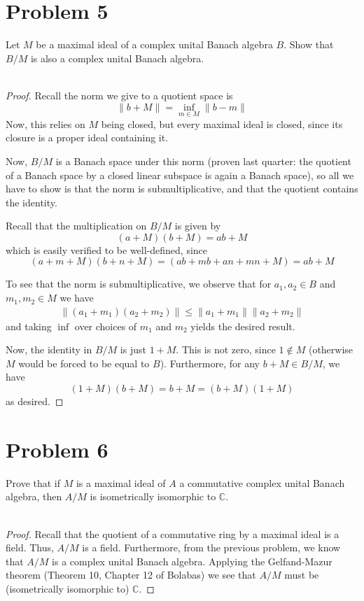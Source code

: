 \documentclass[fontsize=11pt]{scrartcl} %
\numberwithin{equation}{section} %
\numberwithin{figure}{section} %
\numberwithin{table}{section} %
\newcommand{\C}{\mathbb{C}}
\begin{document}
\section*{Problem 5}
Let $M$ be a maximal ideal of a complex unital Banach algebra $B$. Show that
$B/{M}$ is also a complex unital Banach algebra.
\\
\\
\begin{proof}
    Recall the norm we give to a quotient space is
    \[
        \|b + M\| = \inf_{m\in M}\|b-m\|
    \]
    Now, this relies on $M$ being closed, but every maximal ideal is closed,
    since its closure is a proper ideal containing it.

    Now, $B/{M}$ is a Banach space under this norm (proven last quarter: the
        quotient of a Banach space by a closed linear subspace is again a Banach
    space), so all we have to show is that the norm is submultiplicative, and
    that the quotient contains the identity. 

    Recall that the multiplication on $B/{M}$ is given by
    \[
        (a+M)(b+M) = ab+M
    \]
which is easily verified to be well-defined, since 
\[
    (a+m+M)(b+n+M) = (ab + mb + an+mn +M) = ab+M
\]

    To see that the norm is submultiplicative, we observe that for $a_1,a_2\in
    B$ and $m_1,m_2\in M$ we have
    \[
        \begin{aligned}
            \|(a_1+m_1)(a_2+m_2)\|\leq \|a_1+m_1\|\|a_2+m_2\|
        \end{aligned}
    \]
    and taking $\inf$ over choices of $m_1$ and $m_2$ yields the desired result.

    Now, the identity in $B/{M}$ is just $1+M$. This is not zero, since
    $1\not\in M$ (otherwise $M$ would be forced to be equal to $B$).
    Furthermore, for any $b+M\in B/{M}$, we have
    \[
        (1+M)(b+M) = b+M = (b+M)(1+M)
    \]
    as desired.

\end{proof}

\newpage

\section*{Problem 6}
Prove that if $M$ is a maximal ideal of $A$ a commutative complex unital Banach
algebra, then $A/M$ is isometrically isomorphic to $\C$.
\\
\\
\begin{proof}
    Recall that the quotient of a commutative ring by a maximal ideal is a
    field. Thus, $A/{M}$ is a field. Furthermore, from the previous problem, we
    know that $A/{M}$ is a complex unital Banach algebra. Applying the
    Gelfand-Mazur theorem (Theorem 10, Chapter 12 of Bolabas) we see that
    $A/{M}$ must be (isometrically isomorphic to) $\C$.
\end{proof}
\end{document}
